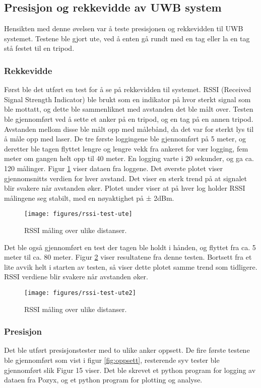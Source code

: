 \subsection{Presisjon og rekkevidde av UWB system}
Hensikten med denne øvelsen var å teste presisjonen og rekkevidden til UWB systemet. 
Testene ble gjort ute, ved å enten gå rundt med en tag eller la en tag stå festet til en tripod.

\subsubsection{Rekkevidde}
Først ble det utført en test for å se på rekkevidden til systemet. 
RSSI (Received Signal Strength Indicator) ble brukt som en indikator på hvor sterkt signal som ble mottatt, 
og dette ble sammenliknet med avstanden det ble målt over. 
Testen ble gjennomført ved å sette et anker på en tripod, og en tag på en annen tripod. Avstanden mellom disse ble målt opp med målebånd, 
da det var for sterkt lys til å måle opp med laser. De tre første loggingene ble gjennomført på 5 meter, 
og deretter ble tagen flyttet lengre og lengre vekk fra ankeret for vær logging, fem meter om gangen helt opp til 40 meter. 
En logging varte i 20 sekunder, og ga ca. 120 målinger. Figur \ref{fig:RSSI1} viser dataen fra loggene. 
Det øverste plotet viser gjennomsnitts verdien for hver avstand. Det viser en sterk trend på at signalet blir 
svakere når avstanden øker. Plotet under viser at på hver log holder RSSI målingene seg stabilt, med en nøyaktighet på ± 2dBm.

\begin{figure}[htp]
\centering
\texttt{[image: figures/rssi-test-ute]}
\caption{RSSI måling over ulike distanser.}
\label{fig:RSSI1}
\end{figure}

Det ble også gjennomført en test der tagen ble holdt i hånden, og flyttet fra ca. 5 meter til ca. 80 meter. 
Figur \ref{fig:RSSI2} viser resultatene fra denne testen. Bortsett fra et lite avvik helt i starten av testen, 
så viser dette plotet samme trend som tidligere. RSSI verdiene blir svakere når avstanden øker.

\begin{figure}[htp]
\centering
\texttt{[image: figures/rssi-test-ute2]}
\caption{RSSI måling over ulike distanser.}
\label{fig:RSSI2}
\end{figure}

\newpage
\subsubsection{Presisjon}
Det ble utført presisjonstester med to ulike anker oppsett. 
De fire første testene ble gjennomført som vist i figur \ref{fig:oppsett}, 
resterende syv tester ble gjennomført slik Figur 15 viser. 
Det ble skrevet et python program for logging av dataen fra Pozyx, 
og et python program for plotting og analyse. 

